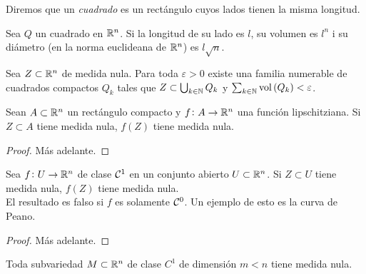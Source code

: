 \begin{defi}
    Diremos que un \textit{cuadrado} es un rectángulo cuyos lados tienen la misma
    longitud.
\end{defi}
\begin{prop*}
    Sea $Q$ un cuadrado en $\mathbb{R} ^n$. Si la longitud de su lado es $l$, su volumen
    es $l^n$ i su diámetro (en la norma euclideana de $\mathbb{R}^n$) es $l\sqrt{n}$.
\end{prop*}
\begin{prop}
    Sea $Z \subset \mathbb{R}^n$ de medida nula. Para toda $\varepsilon >0$ existe una
    familia numerable de cuadrados compactos $Q_k$ tales que $Z\subset
    \bigcup_{k \in \mathbb{N}} Q_k$ y $\sum_{k \in \mathbb{N}} \operatorname{vol} \left( Q_k \right) <
    \varepsilon$.
\end{prop}
\begin{lema}
    Sean $A\subset \mathbb{R}^n$ un rectángulo compacto y $f\colon A \to \mathbb{R}^n$ una
    función lipschitziana. Si $Z \subset A$ tiene medida nula, $f\left(Z \right)$
    tiene medida nula.
\end{lema}
\begin{proof}
    Más adelante.
\end{proof}
\begin{prop}
    Sea $f \colon U \to \mathbb{R}^n$ de clase $\mathcal{C} ^1$ en un conjunto abierto $U \subset
    \mathbb{R} ^n$. Si $Z \subset U$ tiene medida nula, $f\left( Z \right) $ tiene
    medida nula.\\
    El resultado es falso si $f$ es solamente $\mathcal{C} ^0$. Un ejemplo de esto es la
    curva de Peano.
\end{prop}
\begin{proof}
    Más adelante.
\end{proof}
\begin{col}
    Toda subvariedad $M \subset \mathbb{R}^n$ de clase $C^1$ de dimensión $m<n$ tiene
    medida nula.
\end{col}

